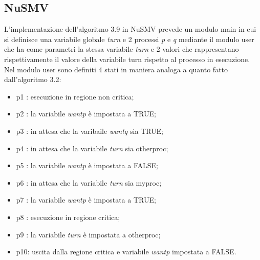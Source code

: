 \documentclass{article}
\begin{document}
\subsection{NuSMV}
L'implementazione dell'algoritmo 3.9 in NuSMV prevede un modulo main in cui si definisce una variabile globale \textit{turn} e 2 processi \textit{p} e \textit{q} mediante il modulo user che ha come parametri la stessa variabile \textit{turn} e 2 valori che rappresentano rispettivamente il valore della variabile turn rispetto al processo in esecuzione. 
\\Nel modulo user sono definiti 4 stati in maniera analoga a quanto fatto dall'algoritmo 3.2:

\begin{itemize}
    \item p1 : esecuzione in regione non critica;
    \item p2 : la variabile \textit{wantp} è impostata a TRUE;
    \item p3 : in attesa che la varibaile \textit{wantq} sia TRUE;
    \item p4 : in attesa che la variabile \textit{turn} sia otherproc;
    \item p5 : la variabile \textit{wantp} è impostata a FALSE;
    \item p6 : in attesa che la variabile \textit{turn} sia myproc;
    \item p7 : la variabile \textit{wantp} è impostata a TRUE;
    \item p8 : esecuzione in regione critica;
    \item p9 : la variabile \textit{turn} è impostata a otherproc;
    \item p10: uscita dalla regione critica e variabile \textit{wantp} impostata a FALSE.
\end{itemize}
\end{document}
